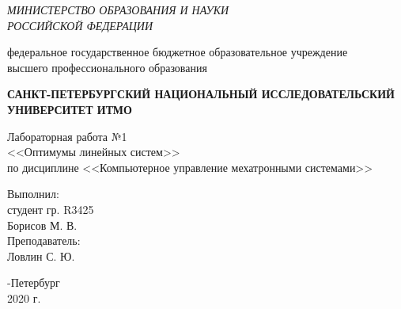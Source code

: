 \begin{titlepage}
	\begin{center}
		\textit{МИНИСТЕРСТВО ОБРАЗОВАНИЯ И НАУКИ\\
			РОССИЙСКОЙ ФЕДЕРАЦИИ}
		\vspace{1ex}
		
		федеральное государственное бюджетное образовательное учреждение\\
		высшего профессионального образования
		\vspace{1ex}
		
		\textbf{САНКТ-ПЕТЕРБУРГСКИЙ НАЦИОНАЛЬНЫЙ ИССЛЕДОВАТЕЛЬСКИЙ УНИВЕРСИТЕТ ИТМО}
		\vspace{13ex}
		
		Лабораторная работа №1\\
		<<Оптимумы линейных систем>>\\
		по дисциплине <<Компьютерное управление мехатронными системами>>\\
	\end{center}
	\vspace{15em}
	\begin{flushright}
		\noindent
		Выполнил:\\
		студент гр. R3425\\
		Борисов М. В.\\
		Преподаватель:\\
		Ловлин С. Ю.
	\end{flushright}
	\vfill
	\begin{center}
		-Петербург\\
		2020 г.\\
	\end{center}
\end{titlepage}